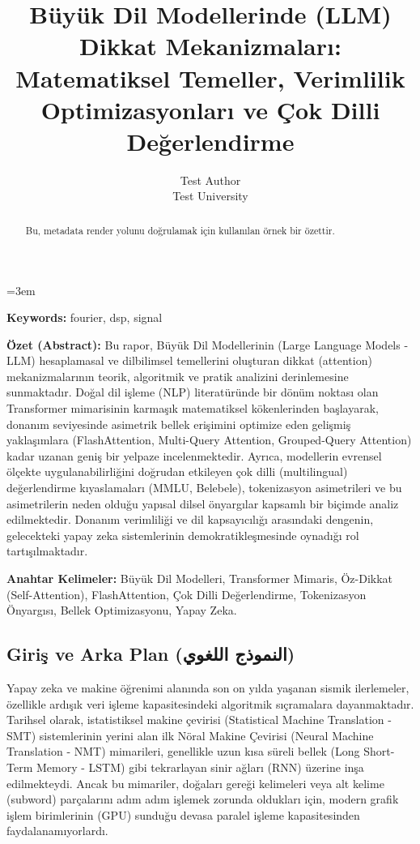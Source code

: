 \documentclass[11pt,a4paper]{article}
\begin{document}
\emergencystretch=3em

\title{Büyük Dil Modellerinde (LLM) Dikkat Mekanizmaları: Matematiksel Temeller, Verimlilik Optimizasyonları ve Çok Dilli Değerlendirme}
\author{Test Author \\ \small Test University}
\date{}
\maketitle

\begin{abstract}
Bu, metadata render yolunu doğrulamak için kullanılan örnek bir özettir.
\end{abstract}

\noindent\textbf{Keywords:} fourier, dsp, signal

\tableofcontents
\newpage

\textbf{Özet (Abstract):} Bu rapor, Büyük Dil Modellerinin (Large Language Models - LLM) hesaplamasal ve dilbilimsel temellerini oluşturan dikkat (attention) mekanizmalarının teorik, algoritmik ve pratik analizini derinlemesine sunmaktadır. Doğal dil işleme (NLP) literatüründe bir dönüm noktası olan Transformer mimarisinin karmaşık matematiksel kökenlerinden başlayarak, donanım seviyesinde asimetrik bellek erişimini optimize eden gelişmiş yaklaşımlara (FlashAttention, Multi-Query Attention, Grouped-Query Attention) kadar uzanan geniş bir yelpaze incelenmektedir. Ayrıca, modellerin evrensel ölçekte uygulanabilirliğini doğrudan etkileyen çok dilli (multilingual) değerlendirme kıyaslamaları (MMLU, Belebele), tokenizasyon asimetrileri ve bu asimetrilerin neden olduğu yapısal dilsel önyargılar kapsamlı bir biçimde analiz edilmektedir. Donanım verimliliği ve dil kapsayıcılığı arasındaki dengenin, gelecekteki yapay zeka sistemlerinin demokratikleşmesinde oynadığı rol tartışılmaktadır.

\textbf{Anahtar Kelimeler:} Büyük Dil Modelleri, Transformer Mimaris, Öz-Dikkat (Self-Attention), FlashAttention, Çok Dilli Değerlendirme, Tokenizasyon Önyargısı, Bellek Optimizasyonu, Yapay Zeka.

\subsection{Giriş ve Arka Plan (النموذج اللغوي)}
Yapay zeka ve makine öğrenimi alanında son on yılda yaşanan sismik ilerlemeler, özellikle ardışık veri işleme kapasitesindeki algoritmik sıçramalara dayanmaktadır. Tarihsel olarak, istatistiksel makine çevirisi (Statistical Machine Translation - SMT) sistemlerinin yerini alan ilk Nöral Makine Çevirisi (Neural Machine Translation - NMT) mimarileri, genellikle uzun kısa süreli bellek (Long Short-Term Memory - LSTM) gibi tekrarlayan sinir ağları (RNN) üzerine inşa edilmekteydi. Ancak bu mimariler, doğaları gereği kelimeleri veya alt kelime (subword) parçalarını adım adım işlemek zorunda oldukları için, modern grafik işlem birimlerinin (GPU) sunduğu devasa paralel işleme kapasitesinden faydalanamıyorlardı.
\end{document}
